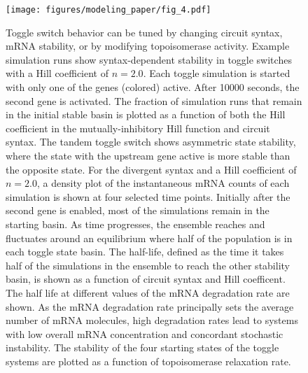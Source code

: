\documentclass[11pt]{article}
\begin{document}
\begin{figure}[htbp]
    \centering
    {\texttt{[image: figures/modeling\_paper/fig\_4.pdf]}
    \label{fig:toggle_tunability_cartoon}%
    \label{fig:toggle_basin_stability}
    \label{fig:toggle_half_life_vs_hill}
    \label{fig:toggle_half_life_vs_mRNA_deg}
    \label{fig:toggle_vs_topo_rate}
    }
    \caption{
         Toggle switch behavior can be tuned by changing circuit syntax, mRNA stability, or by modifying topoisomerase activity.
         Example simulation runs show syntax-dependent stability in toggle switches with a Hill coefficient of \(n = 2.0\). Each toggle simulation is started with only one of the genes (colored) active. After 10000 seconds, the second gene is activated.
         The fraction of simulation runs that remain in the initial stable basin is plotted as a function of both the Hill coefficient in the mutually-inhibitory Hill function and circuit syntax. The tandem toggle switch shows asymmetric state stability, where the state with the upstream gene active is more stable than the opposite state.
         For the divergent syntax and a Hill coefficient of \(n = 2.0\), a density plot of the instantaneous mRNA counts of each simulation is shown at four selected time points. Initially after the second gene is enabled, most of the simulations remain in the starting basin. As time progresses, the ensemble reaches and fluctuates around an equilibrium where half of the population is in each toggle state basin.
         The half-life, defined as the time it takes half of the simulations in the ensemble to reach the other stability basin, is shown as a function of circuit syntax and Hill coefficent.
         The half life at different values of the mRNA degradation rate are shown. As the mRNA degradation rate principally sets the average number of mRNA molecules, high degradation rates lead to systems with low overall mRNA concentration and concordant stochastic instability.
         The stability of the four starting states of the toggle systems are plotted as a function of topoisomerase relaxation rate.
    } \label{fig:top:toggle_switch_tuning}
\end{figure}
\end{document}

